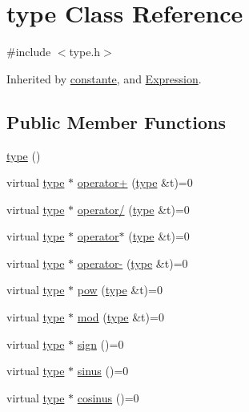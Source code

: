 \hypertarget{classtype}{\section{type Class Reference}
\label{classtype}
}


{\ttfamily \#include $<$type.\-h$>$}



Inherited by \hyperlink{classconstante}{constante}, and \hyperlink{class_expression}{Expression}.

\subsection*{Public Member Functions}
\begin{DoxyCompactItemize}
\item 
\hyperlink{classtype_a24236b97ec65acd7624c81fc33305e7c}{type} ()
\item 
virtual \hyperlink{classtype}{type} $\ast$ \hyperlink{classtype_aae435de533d21af297434702fd71d04d}{operator+} (\hyperlink{classtype}{type} \&t)=0
\item 
virtual \hyperlink{classtype}{type} $\ast$ \hyperlink{classtype_a0fad8179d45b9bbde90b48e1950ce639}{operator/} (\hyperlink{classtype}{type} \&t)=0
\item 
virtual \hyperlink{classtype}{type} $\ast$ \hyperlink{classtype_a9e275d2b8465d6085515f58aaf631ea7}{operator$\ast$} (\hyperlink{classtype}{type} \&t)=0
\item 
virtual \hyperlink{classtype}{type} $\ast$ \hyperlink{classtype_a4d440ee89d624d7314786d8d18751588}{operator-\/} (\hyperlink{classtype}{type} \&t)=0
\item 
virtual \hyperlink{classtype}{type} $\ast$ \hyperlink{classtype_a60bc9fca9ded4e67963e6c9fad82ff01}{pow} (\hyperlink{classtype}{type} \&t)=0
\item 
virtual \hyperlink{classtype}{type} $\ast$ \hyperlink{classtype_ab6f68c2a7481faf20b02aa4ae67c6500}{mod} (\hyperlink{classtype}{type} \&t)=0
\item 
virtual \hyperlink{classtype}{type} $\ast$ \hyperlink{classtype_a59342fe365d621d47b607d3f4e155169}{sign} ()=0
\item 
virtual \hyperlink{classtype}{type} $\ast$ \hyperlink{classtype_ae12b68744cbf5c49e5e065fbf8a13954}{sinus} ()=0
\item 
virtual \hyperlink{classtype}{type} $\ast$ \hyperlink{classtype_ac459ee75f7ab8d345c01a1f9a13f0728}{cosinus} ()=0
\item 

\end{DoxyCompactItemize}
